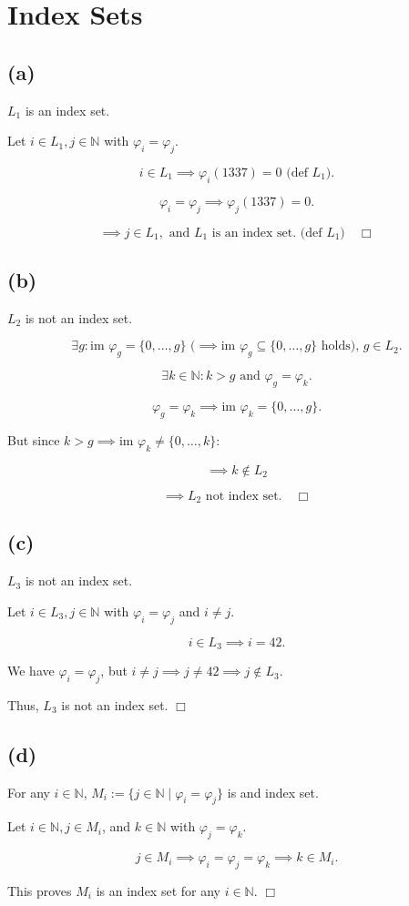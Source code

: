 



\section{Index Sets}

\subsection*{(a)}
$L_1$ is an index set.  

Let $i \in L_1, j \in \mathbb{N}$ with $\varphi_i = \varphi_j$.  

\[
i \in L_1 \implies \varphi_i(1337) = 0  \text{ (def } L_1).
\]

\[
\varphi_i = \varphi_j \implies \varphi_j(1337) = 0.
\]

\[
\implies j \in L_1, \text{ and } L_1 \text{ is an index set.}\text{ (def } L_1)  \quad \Box
\]

\subsection*{(b)}
$L_2$ is not an index set.

\[
\exists g: \text{im } \varphi_g = \{0, \ldots, g\} \text{ (}\implies \text{im } \varphi_g \subseteq \{0, \ldots, g\} \text{ holds), } g \in L_2.
\]

\[
\exists k \in \mathbb{N}: k > g \text{ and } \varphi_g = \varphi_k.
\]

\[
\varphi_g = \varphi_k \implies \text{im } \varphi_k = \{0, \ldots, g\}.
\]

But since $k > g \implies \text{im } \varphi_k \neq \{0, \ldots, k\}$:

\[
\implies k \notin L_2
\]

\[
\implies L_2 \text{ not index set.} \quad \Box
\]

\subsection*{(c)}
$L_3$ is not an index set.

Let $i \in L_3, j \in \mathbb{N}$ with $\varphi_i = \varphi_j$ and $i \neq j$.  

\[
i \in L_3 \implies i = 42.
\]

We have $\varphi_i = \varphi_j$, but $i \neq j \implies j \neq 42 \implies j \notin L_3$.  

Thus, $L_3$ is not an index set. \quad $\Box$

\subsection*{(d)}
For any $i \in \mathbb{N}$, $M_i := \{j \in \mathbb{N} \mid \varphi_i = \varphi_j\}$ is and index set.  

Let $i \in \mathbb{N}, j \in M_i$, and $k \in \mathbb{N}$ with $\varphi_j = \varphi_k$.  

\[
j \in M_i \implies \varphi_i = \varphi_j = \varphi_k \implies k \in M_i.
\]

This proves $M_i$ is an index set for any $i \in \mathbb{N}$. \quad $\Box$


